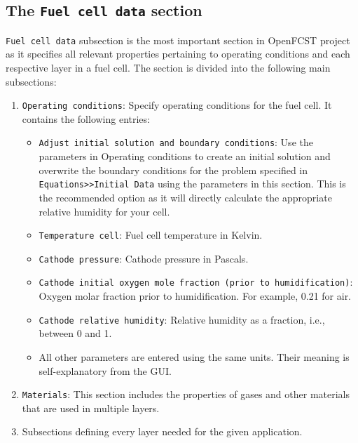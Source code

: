 \subsection{The \texttt{Fuel cell data} section}

\texttt{Fuel cell data} subsection is the most important section in OpenFCST project as it specifies all relevant properties pertaining to operating conditions and each respective layer in a fuel cell. The section is divided into the following main subsections:  
\begin{enumerate}
  \item \texttt{Operating conditions}: Specify operating conditions for the fuel cell. It contains the following entries:
  \begin{itemize}
   \item \texttt{Adjust initial solution and boundary conditions}: Use the parameters in Operating conditions to create an initial solution and overwrite the boundary conditions for the problem specified in \texttt{Equations>>Initial Data} using the parameters in this section. This is the recommended option as it will directly calculate the appropriate relative humidity for your cell.
   \item \texttt{Temperature cell}: Fuel cell temperature in Kelvin.
   \item \texttt{Cathode pressure}: Cathode pressure in Pascals.
   \item \texttt{Cathode initial oxygen mole fraction (prior to humidification)}: Oxygen molar fraction prior to humidification. For example, 0.21 for air.
   \item \texttt{Cathode relative humidity}: Relative humidity as a fraction, i.e., between 0 and 1.
   \item All other parameters are entered using the same units. Their meaning is self-explanatory from the GUI.
  \end{itemize}
  \item \texttt{Materials}: This section includes the properties of gases and other materials that are used in multiple layers.
  \item Subsections defining every layer needed for the given application.
\end{enumerate} 

